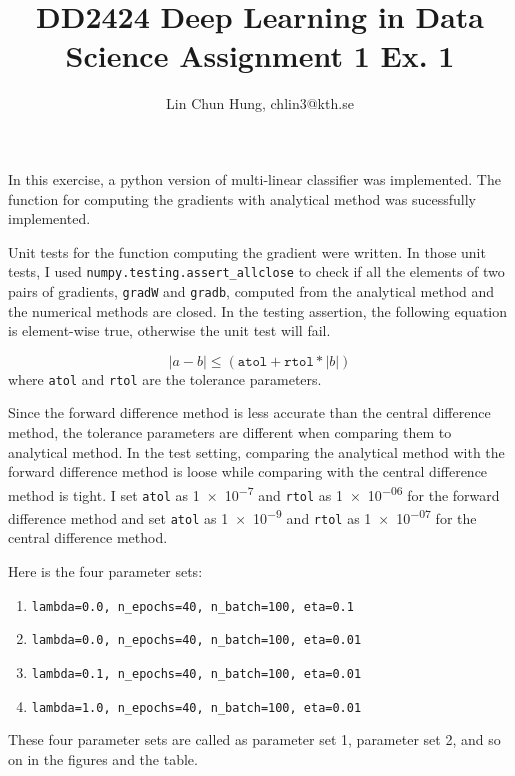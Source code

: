 \documentclass[12pt]{article}
\begin{document}
\title{DD2424 Deep Learning in Data Science Assignment 1 Ex. 1}
\author{Lin Chun Hung, chlin3@kth.se}

\maketitle

In this exercise, a python version of multi-linear classifier was implemented.
The function for computing the gradients with analytical method was sucessfully implemented.

Unit tests for the function computing the gradient were written. In those unit tests,
I used \texttt{numpy.testing.assert\_allclose} to check if all the elements of two pairs of gradients,
\texttt{gradW} and \texttt{gradb}, computed from the analytical method and the numerical methods are closed.
In the testing assertion, the following equation is element-wise true, otherwise the unit test will fail.

\begin{equation*}
    |a - b| \leq (\texttt{atol} + \texttt{rtol} * |b|)
\end{equation*}
where \texttt{atol} and \texttt{rtol} are the tolerance parameters.

Since the forward difference method is less accurate than the central difference method,
the tolerance parameters are different when comparing them to analytical method.
In the test setting, comparing the analytical method with 
the forward difference method is loose while
comparing with the central difference method is tight.
I set \texttt{atol} as \num{1e-7} and \texttt{rtol} as \num{1e-06} for the
forward difference method and set \texttt{atol} as \num{1e-9} and \texttt{rtol} as \num{1e-07}
for the central difference method.

Here is the four parameter sets:
\begin{enumerate}
    \item  \texttt{lambda=0.0, n\_epochs=40, n\_batch=100, eta=0.1}
    \item  \texttt{lambda=0.0, n\_epochs=40, n\_batch=100, eta=0.01}
    \item  \texttt{lambda=0.1, n\_epochs=40, n\_batch=100, eta=0.01}
    \item  \texttt{lambda=1.0, n\_epochs=40, n\_batch=100, eta=0.01}
\end{enumerate}
These four parameter sets are called as parameter set 1, parameter set 2,
and so on in the figures and the table.
\end{document}
